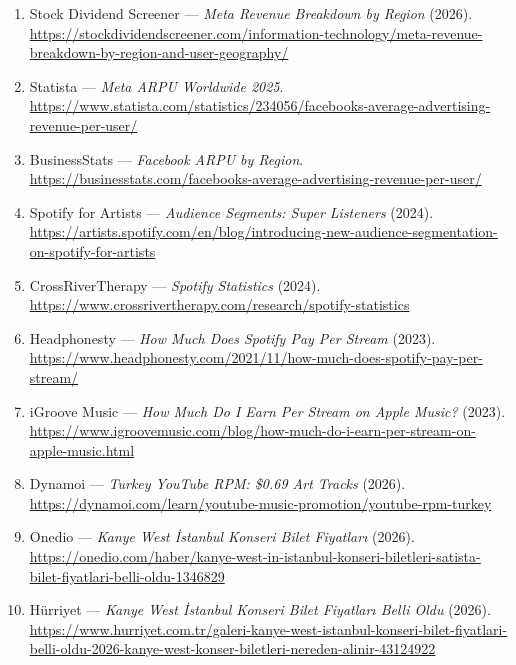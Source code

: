 \documentclass{article}
\begin{document}
\begin{enumerate}
\item Stock Dividend Screener --- \textit{Meta Revenue Breakdown by Region} (2026).
  \url{https://stockdividendscreener.com/information-technology/meta-revenue-breakdown-by-region-and-user-geography/}
\item Statista --- \textit{Meta ARPU Worldwide 2025}.
  \url{https://www.statista.com/statistics/234056/facebooks-average-advertising-revenue-per-user/}
\item BusinessStats --- \textit{Facebook ARPU by Region}.
  \url{https://businesstats.com/facebooks-average-advertising-revenue-per-user/}

\item Spotify for Artists --- \textit{Audience Segments: Super Listeners} (2024).
  \url{https://artists.spotify.com/en/blog/introducing-new-audience-segmentation-on-spotify-for-artists}
\item CrossRiverTherapy --- \textit{Spotify Statistics} (2024).
  \url{https://www.crossrivertherapy.com/research/spotify-statistics}

\item Headphonesty --- \textit{How Much Does Spotify Pay Per Stream} (2023).
  \url{https://www.headphonesty.com/2021/11/how-much-does-spotify-pay-per-stream/}
\item iGroove Music --- \textit{How Much Do I Earn Per Stream on Apple Music?} (2023).
  \url{https://www.igroovemusic.com/blog/how-much-do-i-earn-per-stream-on-apple-music.html}
\item Dynamoi --- \textit{Turkey YouTube RPM: \$0.69 Art Tracks} (2026).
  \url{https://dynamoi.com/learn/youtube-music-promotion/youtube-rpm-turkey}

\item Onedio --- \textit{Kanye West İstanbul Konseri Bilet Fiyatları} (2026).
  \url{https://onedio.com/haber/kanye-west-in-istanbul-konseri-biletleri-satista-bilet-fiyatlari-belli-oldu-1346829}
\item Hürriyet --- \textit{Kanye West İstanbul Konseri Bilet Fiyatları Belli Oldu} (2026).
  \url{https://www.hurriyet.com.tr/galeri-kanye-west-istanbul-konseri-bilet-fiyatlari-belli-oldu-2026-kanye-west-konser-biletleri-nereden-alinir-43124922}

\end{enumerate}
\end{document}
